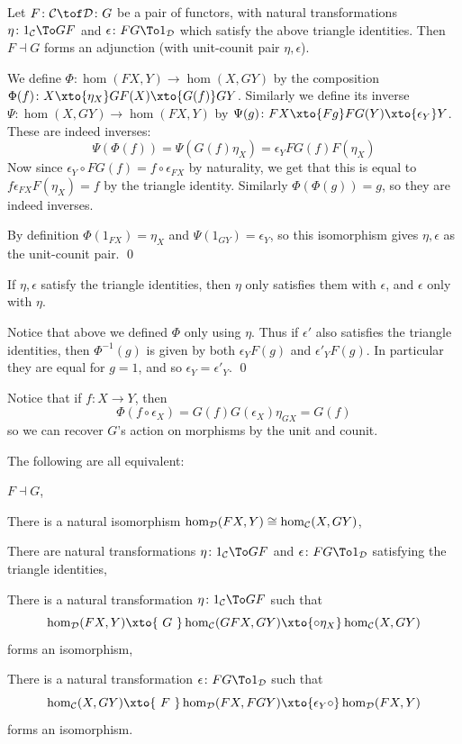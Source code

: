 \eproof

\bthrm

    Let $F\colon\C\tof\D\colon G$ be a pair of functors, with natural transformations $\eta\colon1_\C\To GF$ and $\epsilon\colon FG\To1_\D$ which satisfy the above triangle identities.
    Then $F\dashv G$ forms an adjunction (with unit-counit pair $\eta,\epsilon$).

\ethrm

\bproof

    We define $\Phi\colon\hom(FX,Y)\to\hom(X,GY)$ by the composition $\Phi(f)\colon X\xto{\eta_X}GF(X)\xto{G(f)}GY$.
    Similarly we define its inverse $\Psi\colon\hom(X,GY)\to\hom(FX,Y)$ by $\Psi(g)\colon FX\xto{Fg}FG(Y)\xto{\epsilon_Y}Y$.
    These are indeed inverses:
    $$ \Psi(\Phi(f)) = \Psi(G(f)\eta_X) = \epsilon_YFG(f)F(\eta_X) $$
    Now since $\epsilon_Y\circ FG(f)=f\circ\epsilon_{FX}$ by naturality, we get that this is equal to $f\epsilon_{FX}F(\eta_X)=f$ by the triangle identity.
    Similarly $\Phi(\Phi(g))=g$, so they are indeed inverses.

    By definition $\Phi(1_{FX})=\eta_X$ and $\Psi(1_{GY})=\epsilon_Y$, so this isomorphism gives $\eta,\epsilon$ as the unit-counit pair.
    \qed

\eproof

\bprop

    If $\eta,\epsilon$ satisfy the triangle identities, then $\eta$ only satisfies them with $\epsilon$, and $\epsilon$ only with $\eta$.

\eprop

\bproof

    Notice that above we defined $\Phi$ only using $\eta$.
    Thus if $\epsilon'$ also satisfies the triangle identities, then $\Phi^{-1}(g)$ is given by both $\epsilon_YF(g)$ and $\epsilon'_YF(g)$.
    In particular they are equal for $g=1$, and so $\epsilon_Y=\epsilon'_Y$.
    \qed

\eproof

Notice that if $f\colon X\to Y$, then
$$ \Phi(f\circ\epsilon_X) = G(f)G(\epsilon_X)\eta_{GX} = G(f) $$
so we can recover $G$'s action on morphisms by the unit and counit.

\blemm

    The following are all equivalent:
    \benum
        \item $F\dashv G$,
        \item There is a natural isomorphism $\hom_{{\cal D}}(FX,Y)\cong\hom_{{\cal C}}(X,GY)$,
        \item There are natural transformations $\eta\colon1_\C\To GF$ and $\epsilon\colon FG\To1_\D$ satisfying the triangle identities,
        \item There is a natural transformation $\eta\colon1_\C\To GF$ such that
        $$ \hom_\D(FX,Y) \xto{\ G\ }\hom_\C(GFX,GY) \xto{\circ\eta_X} \hom_\C(X,GY) $$
        forms an isomorphism,
        \item There is a natural transformation $\epsilon\colon FG\To1_\D$ such that
        $$ \hom_\C(X,GY) \xto{\ F\ }\hom_\D(FX,FGY) \xto{\epsilon_Y\circ}\hom_\D(FX,Y) $$
        forms an isomorphism.
    \eenum

